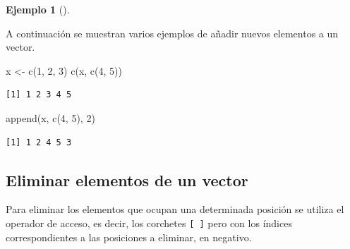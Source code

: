 \documentclass[
  a4paper,
]{scrreport}
\newenvironment{Shaded}{\begin{snugshade}}{\end{snugshade}}
\newcommand{\DecValTok}[1]{\textcolor[rgb]{0.68,0.00,0.00}{#1}}
\newcommand{\FunctionTok}[1]{\textcolor[rgb]{0.28,0.35,0.67}{#1}}
\newcommand{\NormalTok}[1]{\textcolor[rgb]{0.00,0.23,0.31}{#1}}
\newcommand{\OtherTok}[1]{\textcolor[rgb]{0.00,0.23,0.31}{#1}}
\theoremstyle{definition}
\theoremstyle{definition}
\newtheorem{example}{Ejemplo}[chapter]
\theoremstyle{remark}
\begin{document}
\leavevmode{}%
\begin{example}[]\label{exm-añadir-elementos-vector}

A continuación se muestran varios ejemplos de añadir nuevos elementos a
un vector.

\begin{Shaded}
\begin{Highlighting}[]
\NormalTok{x }\OtherTok{\textless{}{-}} \FunctionTok{c}\NormalTok{(}\DecValTok{1}\NormalTok{, }\DecValTok{2}\NormalTok{, }\DecValTok{3}\NormalTok{)}
\FunctionTok{c}\NormalTok{(x, }\FunctionTok{c}\NormalTok{(}\DecValTok{4}\NormalTok{, }\DecValTok{5}\NormalTok{))}
\end{Highlighting}
\end{Shaded}

\begin{verbatim}
[1] 1 2 3 4 5
\end{verbatim}

\begin{Shaded}
\begin{Highlighting}[]
\FunctionTok{append}\NormalTok{(x, }\FunctionTok{c}\NormalTok{(}\DecValTok{4}\NormalTok{, }\DecValTok{5}\NormalTok{), }\DecValTok{2}\NormalTok{)}
\end{Highlighting}
\end{Shaded}

\begin{verbatim}
[1] 1 2 4 5 3
\end{verbatim}

\end{example}

\hypertarget{eliminar-elementos-de-un-vector}{%
\subsection{Eliminar elementos de un
vector}\label{eliminar-elementos-de-un-vector}}

Para eliminar los elementos que ocupan una determinada posición se
utiliza el operador de acceso, es decir, los corchetes \texttt{{[}\ {]}}
pero con los índices correspondientes a las posiciones a eliminar, en
negativo.
\end{document}
